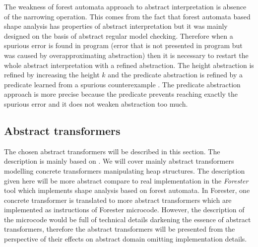 \documentclass[a4paper, 12pt]{article}
\begin{document}
The weakness of forest automata approach to abstract interpretation is absence of
the narrowing operation.
This comes from the fact that forest automata based shape analysis has properties
of abstract interpretation but it was mainly designed on the basis of abstract
regular model checking.
Therefore when a spurious error is found in program (error that is not presented in
program but was caused by overapproximating abstraction) then it is necessary
to restart the whole abstract interpretation with a refined abstraction.
The height abstraction is refined by increasing the height $k$ and the predicate
abstraction is refined by a predicate learned from a spurious counterexample \cite{mt:hruska}.
The predicate abstraction approach is more precise because
the predicate prevents reaching exactly the spurious error and
it does not weaken abstraction too much.

\subsection{Abstract transformers}
The chosen abstract transformers will be described in this section.
The description is mainly based on \cite{atva13}.
We will cover mainly abstract transformers modelling concrete transformers
manipulating heap structures.
The description given here will be more abstract compare to real implementation
in the \emph{Forester} tool \cite{www:forester} which implements shape analysis
based on forest automata.
In Forester, one concrete transformer is translated to more abstract transformers
which are implemented as instructions of Forester microcode.
However, the description of the microcode would be full of technical details
darkening the essence of abstract transformers, therefore the abstract transformers
will be presented from the perspective of their effects on abstract domain
omitting implementation details.
\end{document}
